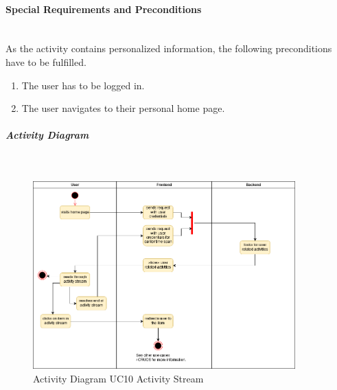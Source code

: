 \paragraph*{Special Requirements and Preconditions}\mbox{}\\
As the activity contains personalized information, the following preconditions have to be fulfilled.
\begin{enumerate}
	\vspace{-3mm}
	\setlength\itemsep{-1em}
	\item The user has to be logged in.
	\item The user navigates to their personal home page.
\end{enumerate}
\newpage
\subparagraph{Activity Diagram}\mbox{}\\
\begin{figure}[H]
	\centering
	\includegraphics[width=0.9\textwidth]{Content/Domain/UC10ActivityStream.png}
	\caption{Activity Diagram \ac{UC}10 Activity Stream}
	\label{fig:label11}
\end{figure}

